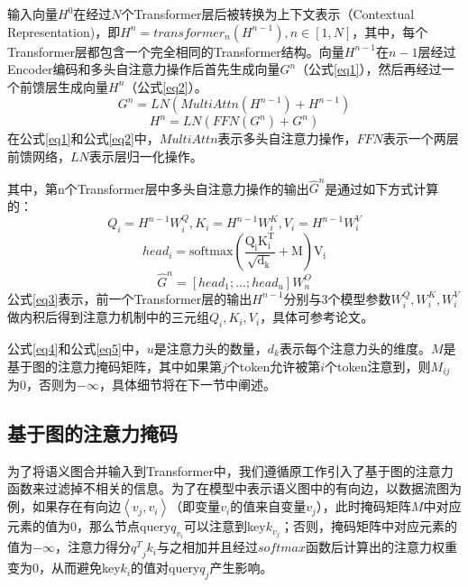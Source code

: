输入向量$H^0$在经过$N$个Transformer层后被转换为上下文表示（Contextual Representation)，即$H^n=transformer_n(H^{n-1}),n\in[1,N]$，其中，每个Transformer层都包含一个完全相同的Transformer结构。向量$H^{n-1}$在$n-1$层经过Encoder编码和多头自注意力操作\cite{attention}后首先生成向量$G^n$（公式\eqref{eq1}），然后再经过一个前馈层生成向量$H^n$（公式\eqref{eq2}）。
\begin{equation}
    G^n=LN(MultiAttn(H^{n-1})+H^{n-1}) \label{eq1}
\end{equation}
\begin{equation}
H^n=LN(FFN(G^n)+G^n) \label{eq2}
\end{equation}
在公式\eqref{eq1}和公式\eqref{eq2}中，$MultiAttn$表示多头自注意力操作，$FFN$表示一个两层前馈网络，$LN$表示层归一化操作。

其中，第n个Transformer层中多头自注意力操作的输出$\hat{G}^n$是通过如下方式计算的：
\begin{equation}
Q_i=H^{n-1}W_i^Q, K_i=H^{n-1}W_i^K, V_i=H^{n-1}W_i^V \label{eq3}
\end{equation}
\begin{equation}
head_i=\text{softmax}(\frac{\mathrm{Q_iK_i^T}}{\sqrt{\mathrm{d_k}}}+\mathrm{M})\mathrm{V_i} \label{eq4}
\end{equation}
\begin{equation}
\hat{G}^n=[head_1;...;head_u]W_n^O \label{eq5}
\end{equation}
公式\eqref{eq3}表示，前一个Transformer层的输出$H^{n-1}$分别与3个模型参数$W_i^Q,W_i^K,W_i^V$做内积后得到注意力机制中的三元组$Q_i,K_i,V_i$，具体可参考论文\cite{attention}。

公式\eqref{eq4}和公式\eqref{eq5}中，$u$是注意力头的数量，$d_k$表示每个注意力头的维度。$M$是基于图的注意力掩码矩阵，其中如果第$j$个token允许被第$i$个token注意到，则$M_{ij}$为0，否则为$-\infty$，具体细节将在下一节中阐述。



\subsection{基于图的注意力掩码}
\label{sec:基于图的注意力掩码}
为了将语义图合并输入到Transformer中，我们遵循原工作\cite{guo2020graphcodebert}引入了基于图的注意力函数来过滤掉不相关的信息。为了在模型中表示语义图中的有向边，以数据流图为例，如果存在有向边$\left\langle v_j,v_i \right\rangle$（即变量$v_i$的值来自变量$v_j$），此时掩码矩阵$M$中对应元素的值为0，那么节点query$q_{v_i}$可以注意到key$k_{v_j}$；否则，掩码矩阵中对应元素的值为$-\infty$，注意力得分${q^T}_jk_i$与之相加并且经过$softmax$函数后计算出的注意力权重变为0，从而避免key$k_i$的值对query$q_j$产生影响。%

